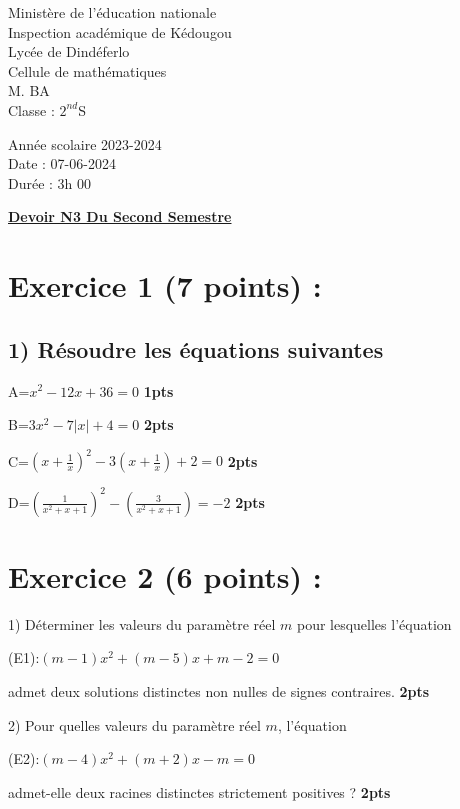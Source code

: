 \documentclass[12pt]{article}
\begin{document}
\begin{minipage}{0.5\textwidth}
	Ministère de l'éducation nationale  \\
	Inspection académique de Kédougou   \\
	Lycée de Dindéferlo            \\
	Cellule de mathématiques            \\
	M. BA                          \\
	Classe : $2^{nd}$S  \\
\end{minipage}
\begin{minipage}{0.5\textwidth}
	Année scolaire 2023-2024 \\
	Date : 07-06-2024 \\
	Durée : 3h 00 \\
\end{minipage}

\begin{center}
	\textbf{{\underline{Devoir N3 Du Second Semestre}}}
\end{center}

\section*{Exercice 1 (7 points) :}
\subsection*{1) Résoudre les équations suivantes}
A=$x^{2}-12x+36=0$ \textbf{1pts}

B=$3x^{2}-7|x|+4 = 0$ \textbf{2pts}

C=$(x+\frac{1}{x})^{2}-3(x+\frac{1}{x})+2=0$ \textbf{2pts}

D=$(\frac{1}{x^{2}+x+1})^{2}-(\frac{3}{x^{2}+x+1})=-2$ \textbf{2pts}
\section*{Exercice 2 (6 points) :}
1) Déterminer les valeurs du paramètre réel \( m \) pour lesquelles l'équation 

(E1):\( (m - 1)x^2 + (m - 5)x + m - 2 = 0 \) 

admet deux solutions distinctes non nulles de signes contraires. \textbf{2pts}

2) Pour quelles valeurs du paramètre réel \( m \), l'équation

(E2):\( (m - 4)x^2 + (m + 2)x - m = 0 \) 
 
admet-elle deux racines distinctes strictement positives ? \textbf{2pts}
\end{document}
